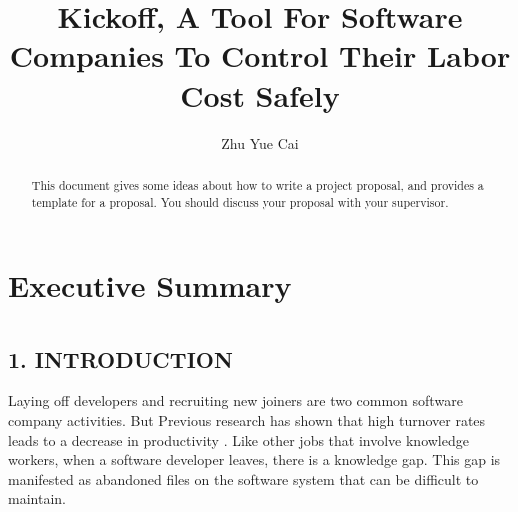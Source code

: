 \documentclass[12pt, a4paper, openright]{report}
\title{Kickoff, A Tool For Software Companies To Control Their Labor Cost Safely}
\author{Zhu Yue Cai}
\date{}
\begin{document}
\frontmatter


\begin{abstract}
	
  This document gives some ideas about how to write a project
  proposal, and provides a template for a proposal. You should discuss
  your proposal with your supervisor.
\end{abstract}


\maketitle
\tableofcontents %
\setcounter{page}{2} %
\chapter*{Executive Summary}
\setcounter{page}{3}




\mainmatter



\chapter*{}

\section*{1. INTRODUCTION}
Laying off developers and recruiting new joiners are two common software company activities. But Previous research has shown that high turnover rates leads to a decrease in productivity \cite{Guthrie2001AMJ}. 
Like other jobs that involve knowledge workers, 
when a software developer leaves, there is a knowledge gap. This gap is manifested as abandoned
files on the software system that can be difficult to maintain.
\end{document}
